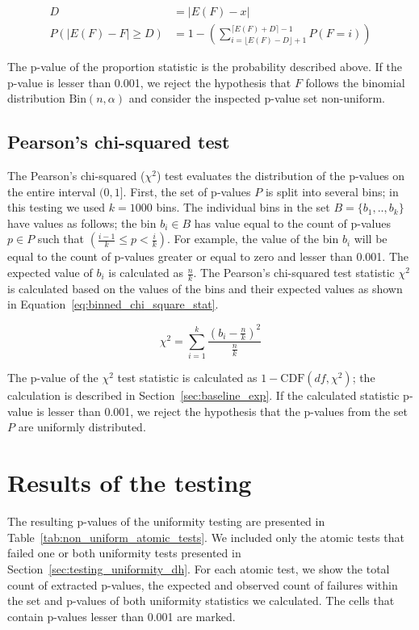 \documentclass[
	digital,    %
	oneside,    %
	color,
	11pt,
	nocover,
	notable,
	nolof,
	nolot,
]{fithesis3}
\theoremstyle{definition}
\theoremstyle{remark}
\begin{document}
\begin{align}
D &= \lvert E(F) - x \rvert \\
\label{eq:prop_statistic}
P(\lvert E(F) - F \rvert \geq D) &= 1 - \left( \sum\limits_{i=\lfloor E(F)-D \rfloor + 1}^{\lceil E(F)+D \rceil - 1} P(F = i) \right)
\end{align}

The p-value of the proportion statistic is the probability described above. If the p-value is lesser than 0.001, we reject the hypothesis that $F$ follows the binomial distribution $\text{Bin}(n,\alpha)$ and consider the inspected p-value set non-uniform.


\subsection{Pearson's chi-squared test}
The Pearson's chi-squared ($\chi^2$) test evaluates the distribution of the p-values on the entire interval $(0,1]$. First, the set of p-values $P$ is split into several bins; in this testing we used $k=1000$ bins. The individual bins in the set $B = \{b_1,..,b_k\}$ have values as follows; the bin $b_i \in B$ has value equal to the count of p-values $p \in P$ such that $\left(\frac{i-1}{k} \leq p < \frac{i}{k}\right)$. For example, the value of the bin $b_i$ will be equal to the count of p-values greater or equal to zero and lesser than 0.001. The expected value of $b_i$ is calculated as $\frac{n}{k}$. The Pearson's chi-squared test statistic $\chi^2$ is calculated based on the values of the bins and their expected values as shown in Equation~\ref{eq:binned_chi_square_stat}.

\begin{equation}
\label{eq:binned_chi_square_stat}
\chi^2 = \sum\limits_{i=1}^{k} \frac{ \left( b_i - \frac{n}{k} \right)^{2} }{\frac{n}{k}}
\end{equation}

The p-value of the $\chi^2$ test statistic is calculated as $1-\text{CDF}(df, \chi^2)$; the calculation is described in Section~\ref{sec:baseline_exp}. If the calculated statistic p-value is lesser than 0.001, we reject the hypothesis that the p-values from the set $P$ are uniformly distributed.

\section{Results of the testing}
The resulting p-values of the uniformity testing are presented in Table~\ref{tab:non_uniform_atomic_tests}. We included only the atomic tests that failed one or both uniformity tests presented in Section~\ref{sec:testing_uniformity_dh}. For each atomic test, we show the total count of extracted p-values, the expected and observed count of failures within the set and p-values of both uniformity statistics we calculated. The cells that contain p-values lesser than 0.001 are marked.
\end{document}
